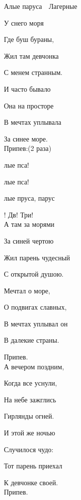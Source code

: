\documentclass[11pt,a5paper]{book}
\renewcommand{\tt}{\indent \indent}
\begin{document}
\begin{song}{Алые паруса}{~}{~}{Лагерные}{}{}

У снего моря \par
Где буш бураны,\par
Жил там девчонка \par
С менем странным.\par
И часто бывало \par
Она на просторе \par
В мечтах уплывала \par
За синее море.\\

Припев:(2 раза)\par
\tt{}лые пса!\par
\tt{}лые пса!\par
\tt{}лые пруса, парус\par
{}! Дв! Три!\\
 
А там за морями \par
За синей чертою \par
Жил парень чудесный \par
С открытой душою.\par
Мечтал о море,\par
О подвигах славных,\par
В мечтах уплывал он \par
В далекие страны.\\

\newpage

Припев.\\
 
А вечером поздним,\par
Когда все уснули,\par
На небе зажглись \par
Гирлянды огней.\par
И этой же ночью \par
Случилося чудо:\par
Тот парень приехал \par
К девчонке своей.\\

Припев.\\


\end{song}
\end{document}
